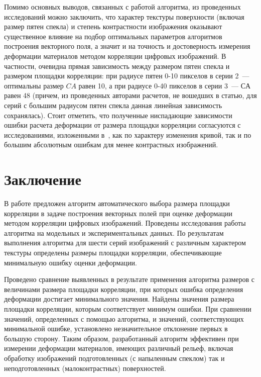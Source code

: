 \documentclass[a4paper]{jctart10}
\begin{document}
Помимо основных выводов, связанных с работой алгоритма, из проведенных исследований можно заключить, что характер текстуры поверхности (включая размер пятен спекла) и степень контрастности изображения оказывают существенное влияние на подбор оптимальных параметров алгоритмов построения векторного поля, а значит и на точность и достоверность измерения деформации материалов методом корреляции цифровых изображений. В частности, очевидна прямая зависимость между размером пятен спекла и размером площадки корреляции: при радиусе пятен 0-10 пикселов в серии 2~--- оптимальны размер $CA$ равен 10, а при радиусе 0-40 пикселов в серии 3~--- $СА$ равен 48 (причем, из проведенных авторами расчетов, не вошедших в статью, для серий с большим радиусом пятен спекла данная линейная зависимость сохранялась). Стоит отметить, что полученные ниспадающие зависимости ошибки расчета деформации от размера площадки корреляции согласуются с исследованиями, изложенными в~\cite{12}, как по характеру изменения кривой, так и по большим абсолютным ошибкам для менее контрастных изображений.

\section*{Заключение}

В работе предложен алгоритм автоматического выбора размера площадки корреляции в задаче построения векторных полей при оценке деформации методом корреляции цифровых изображений. Проведены исследования работы алгоритма на модельных и экспериментальных данных. По результатам выполнения алгоритма для шести серий изображений с различным характером текстуры определены размеры площадки корреляции, обеспечивающие минимальную ошибку оценки деформации.

Проведено сравнение выявленных в результате применения алгоритма размеров с величинами размера площадки корреляции, при которых ошибка определения деформации достигает минимального значения. Найдены значения размера площадки корреляции, которым соответствует минимум ошибки. При сравнении значений, определенных с помощью алгоритма, и значений, соответствующих минимальной ошибке, установлено незначительное отклонение первых в большую сторону. Таким образом, разработанный алгоритм эффективен при измерении деформации материалов, имеющих различный рельеф, включая обработку изображений подготовленных (с напыленным спеклом) так и неподготовленных (малоконтрастных) поверхностей.
\end{document}
